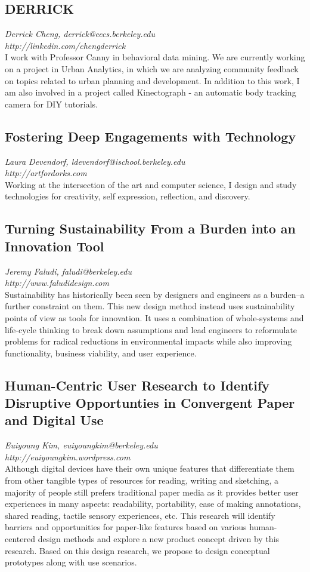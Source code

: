 \documentclass[foldmark,10pt,a4paper,notumble]{leaflet}
\begin{document}
\subsection{DERRICK}
\emph{Derrick Cheng, derrick@eecs.berkeley.edu}\\
\emph{http://linkedin.com/chengderrick}\\
I work with Professor Canny in behavioral data mining. We are currently working on a project in Urban Analytics, in which we are analyzing community feedback on topics related to urban planning and development. 
In addition to this work, I am also involved in a project called Kinectograph - an automatic body tracking camera for DIY tutorials.

\subsection{Fostering Deep Engagements with Technology}
\emph{Laura Devendorf, ldevendorf@ischool.berkeley.edu}\\
\emph{http://artfordorks.com}\\
Working at the intersection of the art and computer science, I design and study technologies for creativity, self expression, reflection, and discovery.

\subsection{Turning Sustainability From a Burden into an Innovation Tool}
\emph{Jeremy Faludi, faludi@berkeley.edu}\\
\emph{http://www.faludidesign.com}\\
Sustainability has historically been seen by designers and engineers as a burden--a further constraint on them.  This new design method instead uses sustainability points of view as tools for innovation.  It uses a combination of whole-systems and life-cycle thinking to break down assumptions and lead engineers to reformulate problems for radical reductions in environmental impacts while also improving functionality, business viability, and user experience.

\subsection{Human-Centric User Research to Identify Disruptive Opportunties in Convergent Paper and Digital Use}
\emph{Euiyoung Kim, euiyoungkim@berkeley.edu}\\
\emph{http://euiyoungkim.wordpress.com}\\
Although digital devices have their own unique features that differentiate them from other
tangible types of resources for reading, writing and sketching, a majority of people still prefers traditional
paper media as it provides better user experiences in many aspects: readability, portability, ease of
making annotations, shared reading, tactile sensory experiences, etc. This research will identify
barriers and opportunities for paper-like features based on various human-centered design methods and
explore a new product concept driven by this research. Based on this design research, we propose to
design conceptual prototypes along with use scenarios. 
\end{document}
